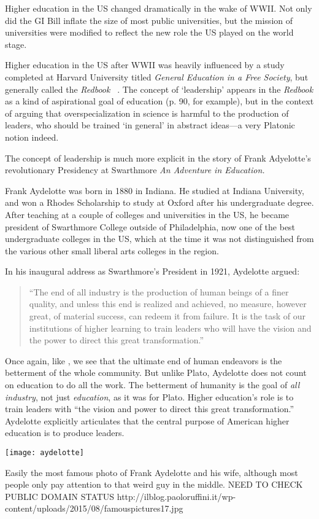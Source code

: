 Higher education in the US changed dramatically in the wake of WWII. Not only did the GI Bill inflate the size of most public universities, but the mission of universities were modified to reflect the new role the US played on the world stage. 

Higher education in the US after WWII was heavily influenced by a study completed at Harvard University titled \emph{General Education in a Free Society}, but generally called the \emph{Redbook} ~\citep{Buck:1945uu}. The concept of `leadership' appears in the \emph{Redbook} as a kind of aspirational goal of education (p. 90, for example), but in the context of arguing that overspecialization in science is harmful to the production of leaders, who should be trained `in general' in abstract ideas---a very Platonic notion indeed. 

The concept of leadership is much more explicit in the story of Frank Adyelotte's revolutionary Presidency at Swarthmore \emph{An Adventure in Education.} ~\citep{Faculty:2006vj} 

Frank Aydelotte was born in 1880 in Indiana. He studied at Indiana University, and won a Rhodes Scholarship to study at Oxford after his undergraduate degree. After teaching at a couple of colleges and universities in the US, he became president of Swarthmore College outside of Philadelphia, now one of the best undergraduate colleges in the US, which at the time it was not distinguished from the various other small liberal arts colleges in the region.

In his inaugural address as Swarthmore's President in 1921, Aydelotte argued:

\begin{quote}

``The end of all industry is the production of human beings of a finer quality, and unless this end is realized and achieved, no measure, however great, of material success, can redeem it from failure. It is the task of our institutions of higher learning to train leaders who will have the vision and the power to direct this great transformation.'' 
\end{quote}

Once again, like , we see that the ultimate end of human endeavors is the betterment of the whole community. But unlike Plato, Aydelotte does not count on education to do all the work. The betterment of humanity is the goal of \emph{all industry}, not just \emph{education}, as it was for Plato. Higher education's role is to train leaders with ``the vision and power to direct this great transformation.'' Aydelotte explicitly articulates that the central purpose of American higher education is to produce leaders.\begin{marginfigure}\texttt{[image: aydelotte]}\caption{Easily the most famous photo of Frank Aydelotte and his wife, although most people only pay attention to that weird guy in the middle. NEED TO CHECK PUBLIC DOMAIN STATUS http://ilblog.paoloruffini.it/wp-content/uploads/2015/08/famouspictures17.jpg}\label{fig:aydelotte}\end{marginfigure}

